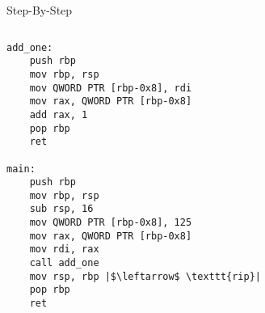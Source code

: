 \documentclass[hyphens,aspectratio=169]{beamer}
\begin{document}
\begin{frame}[fragile]{Step-By-Step}
    \begin{columns}
        \begin{column}{0.33\textwidth}
            \begin{verbatim}
add_one:
    push rbp
    mov rbp, rsp
    mov QWORD PTR [rbp-0x8], rdi
    mov rax, QWORD PTR [rbp-0x8]
    add rax, 1
    pop rbp
    ret

main:
    push rbp
    mov rbp, rsp
    sub rsp, 16
    mov QWORD PTR [rbp-0x8], 125
    mov rax, QWORD PTR [rbp-0x8]
    mov rdi, rax
    call add_one
    mov rsp, rbp |$\leftarrow$ \texttt{rip}|
    pop rbp
    ret
            \end{verbatim}
        \end{column}
        \begin{column}{0.33\textwidth}
\end{column}
\end{columns}
\end{frame}
\end{document}
